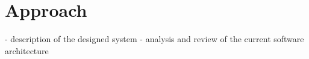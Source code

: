 \chapter{Approach}
\label{ch:approach}


- description of the designed system
- analysis and review of the current software architecture